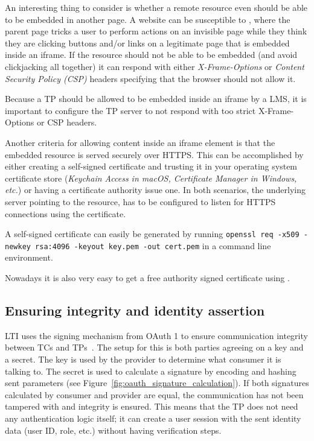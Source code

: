 
An interesting thing to consider is whether a remote resource even should be able to be embedded in another page. A website can be susceptible to \cite{2019Clickjacking}, where the parent page tricks a user to perform actions on an invisible page while they think they are clicking buttons and/or links on a legitimate page that is embedded inside an iframe. If the resource should not be able to be embedded (and avoid clickjacking all together) it can respond with either \emph{X-Frame-Options} or \emph{Content Security Policy (CSP)} headers specifying that the browser should not allow it.

Because a TP should be allowed to be embedded inside an iframe by a LMS, it is important to configure the TP server to not respond with too strict X-Frame-Options or CSP headers.


Another criteria for allowing content inside an iframe element is that the embedded resource is served securely over HTTPS. This can be accomplished by either creating a self-signed certificate and trusting it in your operating system certificate store (\emph{Keychain Access in macOS, Certificate Manager in Windows, etc.}) or having a certificate authority issue one. In both scenarios, the underlying server pointing to the resource, has to be configured to listen for HTTPS connections using the certificate.

A self-signed certificate can easily be generated by running \texttt{openssl req -x509 -newkey rsa:4096 -keyout key.pem -out cert.pem} in a command line environment.

Nowadays it is also very easy to get a free authority signed certificate using \cite{2019LetsEncrypt}.

\label{ensuring_integrity}
\subsection{Ensuring integrity and identity assertion}
LTI uses the signing mechanism from OAuth 1 to ensure communication integrity between TCs and TPs~\citep{2010OAuth1, 2019IsRequest}. The setup for this is both parties agreeing on a key and a secret. The key is used by the provider to determine what consumer it is talking to. The secret is used to calculate a signature by encoding and hashing sent parameters (see Figure~\ref{fig:oauth_signature_calculation}). If both signatures calculated by consumer and provider are equal, the communication has not been tampered with and integrity is ensured.
This means that the TP does not need any authentication logic itself; it can create a user session with the sent identity data (user ID, role, etc.) without having verification steps.

